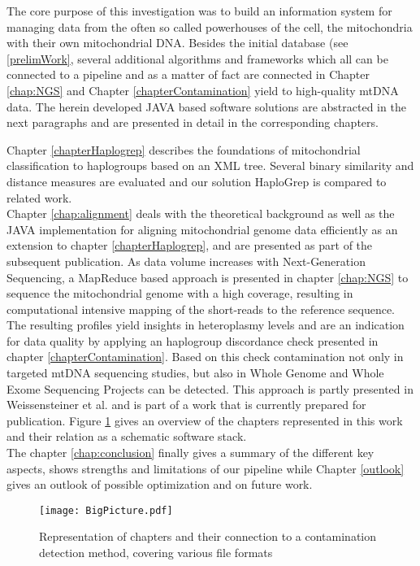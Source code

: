 The core purpose of this investigation was to build an information system for managing data from the often so called powerhouses of the cell, the mitochondria with their own mitochondrial DNA. Besides the initial database (see \ref{prelimWork}, several additional algorithms and frameworks which all can be connected to a pipeline and as a matter of fact are connected in Chapter \ref{chap:NGS} and Chapter \ref{chapterContamination} yield to high-quality mtDNA data. The herein developed JAVA based software solutions are abstracted in the next paragraphs and are presented in detail in the corresponding chapters.

Chapter \ref{chapterHaplogrep} describes the foundations of mitochondrial classification to haplogroups based on an XML tree. Several binary similarity and distance measures are evaluated and our solution HaploGrep is compared to related work. \\

Chapter \ref{chap:alignment} deals with the theoretical background as well as the JAVA implementation for aligning mitochondrial genome data efficiently as an extension to chapter \ref{chapterHaplogrep}, and are presented as part of the subsequent publication. As data volume increases with Next-Generation Sequencing, a MapReduce based approach is presented in chapter \ref{chap:NGS} to sequence the mitochondrial genome with a high coverage, resulting in computational intensive mapping of the short-reads to the reference sequence. 
\\
The resulting profiles yield insights in heteroplasmy levels and are an indication for data quality by applying an haplogroup discordance check presented in chapter \ref{chapterContamination}. Based on this check contamination not only in targeted mtDNA sequencing studies, but also in Whole Genome and Whole Exome Sequencing Projects can be detected. This approach is partly presented in Weissensteiner et al. \cite{Weissensteiner2016b} and is part of a work that is currently prepared for publication. Figure \ref{fig:figureBigPic} gives an overview of the chapters represented in this work and their relation as a schematic software stack.
\\ 
The chapter \ref{chap:conclusion} finally gives a summary of the different key aspects, shows strengths and limitations of our pipeline while Chapter \ref{outlook} gives an outlook of possible optimization and on future work.

\begin{figure}[ht]
\begin{center}
\texttt{[image: BigPicture.pdf]}
\caption[Representation of chapters]{Representation of chapters and their connection to a contamination detection method, covering various file formats }
\label{fig:figureBigPic}
\end{center}
\end{figure}

